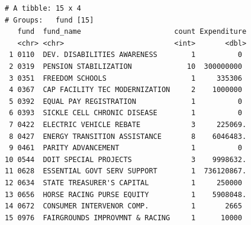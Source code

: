 \documentclass[
  letterpaper,
  DIV=11,
  numbers=noendperiod]{scrreport}
\begin{document}
\begin{verbatim}
# A tibble: 15 x 4
# Groups:   fund [15]
   fund  fund_name                      count Expenditure
   <chr> <chr>                          <int>       <dbl>
 1 0110  DEV. DISABILITIES AWARENESS        1          0 
 2 0319  PENSION STABILIZATION             10  300000000 
 3 0351  FREEDOM SCHOOLS                    1     335306 
 4 0367  CAP FACILITY TEC MODERNIZATION     2    1000000 
 5 0392  EQUAL PAY REGISTRATION             1          0 
 6 0393  SICKLE CELL CHRONIC DISEASE        1          0 
 7 0422  ELECTRIC VEHICLE REBATE            3     225069.
 8 0427  ENERGY TRANSITION ASSISTANCE       8    6046483.
 9 0461  PARITY ADVANCEMENT                 1          0 
10 0544  DOIT SPECIAL PROJECTS              3    9998632.
11 0628  ESSENTIAL GOVT SERV SUPPORT        1  736120867.
12 0634  STATE TREASURER'S CAPITAL          1     250000 
13 0656  HORSE RACING PURSE EQUITY          1    5908048.
14 0672  CONSUMER INTERVENOR COMP.          1       2665 
15 0976  FAIRGROUNDS IMPROVMNT & RACING     1      10000 
\end{verbatim}
\end{document}
